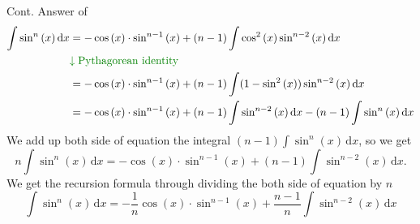 \documentclass[10pt, aspectratio=1610]{beamer}
\begin{document}
\begin{frame}{Cont. Answer of }\vspace{4pt}\label{slide:14}
  \begin{align*}
  \int \sin^n{(x)}\,\mathrm{d}x &= -\cos{(x)}\cdot \sin^{n-1}{(x)} + (n-1)\int \cos^2{(x)}\sin^{n-2}{(x)}\,\mathrm{d}x\\
  &\textcolor[rgb]{0.0,0.5,0.0}{\downarrow \text{Pythagorean identity}}\\
  &= -\cos{(x)}\cdot \sin^{n-1}{(x)} + (n-1)\int (1-\sin^2{(x)})\sin^{n-2}{(x)}\,\mathrm{d}x\\
  &= -\cos{(x)}\cdot \sin^{n-1}{(x)} + (n-1)\int \sin^{n-2}{(x)}\,\mathrm{d}x - (n-1)\int \sin^n{(x)}\,\mathrm{d}x\\
  \end{align*}
  We add up both side of equation the integral $(n-1)\int \sin^n{(x)}\,\mathrm{d}x$, so we get 
  \[n \int \sin^n{(x)}\,\mathrm{d}x = -\cos{(x)}\cdot \sin^{n-1}{(x)} + (n-1)\int \sin^{n-2}{(x)}\,\mathrm{d}x.\]
  We get the recursion formula through dividing the both side of equation by $n$
  \[\int \sin^{n}{(x)}\,\mathrm{d}x = -\frac{1}{n}\cos{(x)}\cdot \sin^{n-1}{(x)} 
  +\frac{n-1}{n}\int \sin^{n-2}{(x)}\,\mathrm{d}x\]
  \hfill
  \hyperlink{slide:12}{}
\end{frame}
\end{document}

